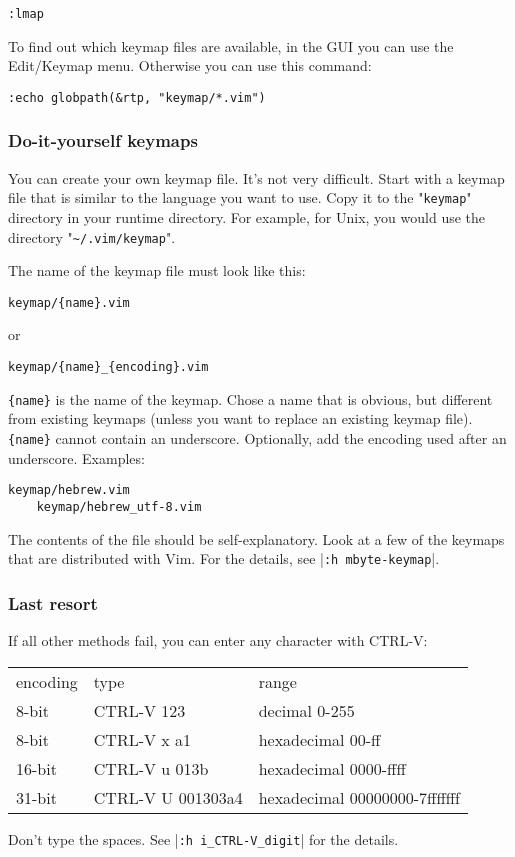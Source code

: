 \begin{Verbatim}[samepage=true]
 :lmap
\end{Verbatim}

To find out which keymap files are available, in the GUI you can use the Edit/Keymap menu.
Otherwise you can use this command:

\begin{Verbatim}[samepage=true]
 :echo globpath(&rtp, "keymap/*.vim")
\end{Verbatim}

\subsubsection{Do-it-yourself keymaps}
You can create your own keymap file.
It's not very difficult.
Start with a keymap file that is similar to the language you want to use.
Copy it to the "\verb!keymap!" directory in your runtime directory.
For example, for Unix, you would use the directory "\verb!~/.vim/keymap!".

The name of the keymap file must look like this:

\begin{Verbatim}[samepage=true]
    keymap/{name}.vim 
\end{Verbatim}
or
\begin{Verbatim}[samepage=true]
    keymap/{name}_{encoding}.vim 
\end{Verbatim}

\verb!{name}! is the name of the keymap.
Chose a name that is obvious, but different from existing keymaps (unless you want to replace an existing keymap file).
\verb!{name}! cannot contain an underscore.
Optionally, add the encoding used after an underscore.
Examples:

\begin{Verbatim}[samepage=true]
    keymap/hebrew.vim 
    keymap/hebrew_utf-8.vim 
\end{Verbatim}

The contents of the file should be self-explanatory.
Look at a few of the keymaps that are distributed with Vim.
For the details, see |\verb!:h mbyte-keymap!|.

\subsubsection{Last resort}
If all other methods fail, you can enter any character with CTRL-V:

\begin{center} \begin{tabular}{l l l}
				encoding & type & range \\
				8-bit & CTRL-V 123 & decimal 0-255 \\
				8-bit & CTRL-V x a1 & hexadecimal 00-ff \\
				16-bit & CTRL-V u 013b & hexadecimal 0000-ffff \\
				31-bit & CTRL-V U 001303a4 & hexadecimal 00000000-7fffffff \\
\end{tabular} \end{center}

Don't type the spaces.
See |\verb!:h i_CTRL-V_digit!| for the details.
\clearpage
